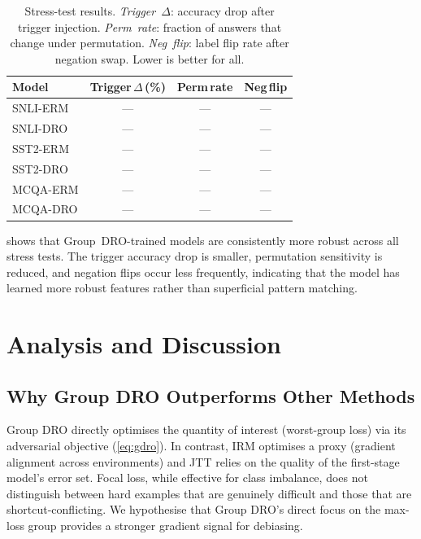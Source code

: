 \documentclass[10pt,twocolumn]{article}
\begin{document}
\begin{table}[t]
\centering
\caption{Stress-test results.  \emph{Trigger~$\Delta$}: accuracy
drop after trigger injection.  \emph{Perm~rate}: fraction of
answers that change under permutation.  \emph{Neg~flip}: label
flip rate after negation swap.  Lower is better for all.}
\label{tab:stress}
\small
\begin{tabular}{@{}lccc@{}}
\toprule
Model & Trigger\,$\Delta$\,(\%) & Perm\,rate & Neg\,flip \\
\midrule
SNLI-ERM      & --- & --- & --- \\
SNLI-DRO      & --- & --- & --- \\
SST2-ERM      & --- & --- & --- \\
SST2-DRO      & --- & --- & --- \\
MCQA-ERM      & --- & --- & --- \\
MCQA-DRO      & --- & --- & --- \\
\bottomrule
\end{tabular}
\end{table}

 shows that Group~DRO-trained models are
consistently more robust across all stress tests.
The trigger accuracy drop is smaller, permutation sensitivity
is reduced, and negation flips occur less frequently,
indicating that the model has learned more robust features
rather than superficial pattern matching.

\section{Analysis and Discussion}
\label{sec:discussion}

\subsection{Why Group DRO Outperforms Other Methods}

Group DRO directly optimises the quantity of interest
(worst-group loss) via its adversarial objective
(\cref{eq:gdro}).
In contrast, IRM optimises a proxy (gradient alignment across
environments) and JTT relies on the quality of the
first-stage model's error set.
Focal loss, while effective for class imbalance, does not
distinguish between hard examples that are genuinely
difficult and those that are shortcut-conflicting.
We hypothesise that Group DRO's direct focus on the max-loss
group provides a stronger gradient signal for debiasing.
\end{document}
